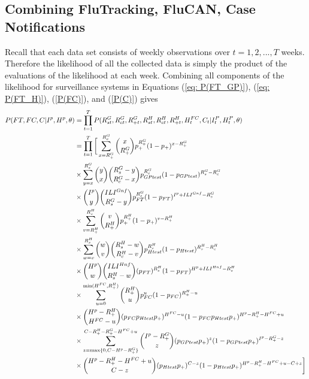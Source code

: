 \subsection{Combining FluTracking, FluCAN, Case Notifications}
Recall that each data set consists of weekly observations over $t=1, 2, ..., T$ weeks. Therefore the likelihood of all the collected data is simply the product of the evaluations of the likelihood at each week. Combining all components of the likelihood for surveillance systems in Equations (\ref{eq: P(FT_GP)}), (\ref{eq: P(FT_H)}), (\ref{P(FC)}), and (\ref{P(C)}) gives
\begin{align} \notag
P(FT, FC, C | I^p, H^p, \theta) &= \prod_{t=1}^{T} P(R_{st}^G, R_{ct}^G, R_{+t}^G, R_{st}^H, R_{ct}^H, R_{+t}^H, H_t^{FC}, C_t | I_{t}^P, H_t^P, \theta) \\ \notag
&= \prod_{t=1}^{T} \bigg[ \sum_{x=R_{+}^G}^{R_{c}^G} \binom{x}{R_+^G} p_+^{R_{+}^G}(1-p_+)^{x-R_{+}^G} \\ \notag
& \times \sum_{y=x}^{R_{s}^G} \binom{y}{x} \binom{R_{s}^G-y}{R_{c}^G-x} p_{GPtest}^{R_{c}^G}(1-p_{GPtest})^{R_{s}^G-R_{c}^G} \\ \notag
& \times \binom{I^p}{y} \binom{ILI^{Gnf}}{R_{s}^G-y} p_{FT}^{R_{s}^G}(1-p_{FT})^{I^p+ILI^{Gnf}-R_{s}^G} \\ \notag
& \times \sum_{v=R_{+}^H}^{R_{c}^H} \binom{v}{R_{+}^H} p_+^{R_{+}^H}(1-p_+)^{v-R_{+}^H} \\ \notag
& \times \sum_{w=v}^{R_{s}^H} \binom{w}{v} \binom{R_{s}^H-w}{R_{c}^H-v} p_{Htest}^{R_{c}^H}(1-p_{Htest})^{R_{s}^H-R_{c}^H} \\ \notag
& \times \binom{H^p}{w} \binom{ILI^{Hnf}}{R_{s}^H-w} (p_{FT})^{R_{s}^H}(1-p_{FT})^{H^p+ILI^{Hnf} - R_{s}^H} \\\notag
& \times \sum_{u=0}^{\min(H^{FC},R_+^{H})} \binom{R_+^H}{u} p_{FC}^{u} (1-p_{FC})^{R_+^H-u} \\ \notag 
& \times \binom{H^p - R_+^H}{H^{FC} - u} (p_{FC}p_{Htest}p_+)^{H^{FC} - u} (1-p_{FC}p_{Htest}p_+)^{H^p - R_+^H - H^{FC} + u} \\ \notag
& \times \sum_{z=\max\{0,C-H^p-R_+^G\}}^{C-R_+^H-R_+^G-H^{FC}+u} \binom{I^p-R_+^G}{z} (p_{GPtest}p_{+})^{z} (1-p_{GPtest}p_{+})^{I^p-R_+^G-z} \\ \label{eq: L}
& \times \binom{H^p-R_+^H-H^{FC}+u}{C-z} (p_{Htest}p_{+})^{C-z} (1-p_{Htest}p_{+})^{H^p-R_+^H-H^{FC}+u-C+z}
\bigg]
\end{align}

